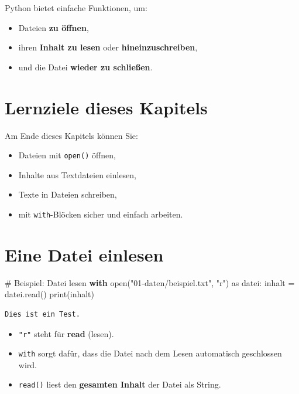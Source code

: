 \documentclass[
  letterpaper,
  DIV=11,
  numbers=noendperiod]{scrreprt}
\newenvironment{Shaded}{\begin{snugshade}}{\end{snugshade}}
\newcommand{\BuiltInTok}[1]{\textcolor[rgb]{0.00,0.23,0.31}{#1}}
\newcommand{\CommentTok}[1]{\textcolor[rgb]{0.37,0.37,0.37}{#1}}
\newcommand{\ControlFlowTok}[1]{\textcolor[rgb]{0.00,0.23,0.31}{\textbf{#1}}}
\newcommand{\ImportTok}[1]{\textcolor[rgb]{0.00,0.46,0.62}{#1}}
\newcommand{\NormalTok}[1]{\textcolor[rgb]{0.00,0.23,0.31}{#1}}
\newcommand{\OperatorTok}[1]{\textcolor[rgb]{0.37,0.37,0.37}{#1}}
\newcommand{\StringTok}[1]{\textcolor[rgb]{0.13,0.47,0.30}{#1}}
\providecommand{\tightlist}{%
  \setlength{\itemsep}{0pt}\setlength{\parskip}{0pt}}\usepackage{longtable,booktabs,array}
\begin{document}
Python bietet einfache Funktionen, um:

\begin{itemize}
\tightlist
\item
  Dateien \textbf{zu öffnen},
\item
  ihren \textbf{Inhalt zu lesen} oder \textbf{hineinzuschreiben},
\item
  und die Datei \textbf{wieder zu schließen}.
\end{itemize}

\section{Lernziele dieses Kapitels}\label{lernziele-dieses-kapitels-4}

Am Ende dieses Kapitels können Sie:

\begin{itemize}
\tightlist
\item
  Dateien mit \texttt{open()} öffnen,
\item
  Inhalte aus Textdateien einlesen,
\item
  Texte in Dateien schreiben,
\item
  mit \texttt{with}-Blöcken sicher und einfach arbeiten.
\end{itemize}

\section{Eine Datei einlesen}\label{eine-datei-einlesen}

\begin{Shaded}
\begin{Highlighting}[]
\CommentTok{\# Beispiel: Datei lesen}
\ControlFlowTok{with} \BuiltInTok{open}\NormalTok{(}\StringTok{"01{-}daten/beispiel.txt"}\NormalTok{, }\StringTok{"r"}\NormalTok{) }\ImportTok{as}\NormalTok{ datei:}
\NormalTok{    inhalt }\OperatorTok{=}\NormalTok{ datei.read()}
    \BuiltInTok{print}\NormalTok{(inhalt)}
\end{Highlighting}
\end{Shaded}

\begin{verbatim}
Dies ist ein Test.
\end{verbatim}

\begin{itemize}
\tightlist
\item
  \texttt{"r"} steht für \textbf{read} (lesen).
\item
  \texttt{with} sorgt dafür, dass die Datei nach dem Lesen automatisch
  geschlossen wird.
\item
  \texttt{read()} liest den \textbf{gesamten Inhalt} der Datei als
  String.
\end{itemize}
\end{document}
